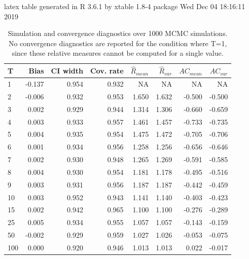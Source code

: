 \documentclass[article]{jss}
\begin{document}

latex table generated in R 3.6.1 by xtable 1.8-4 package
Wed Dec 04 18:16:11 2019
\begin{table}[ht]
\centering
\caption{Simulation and convergence diagnostics over 1000 MCMC simulations. \footnotesize{No convergence diagnostics are reported for the condition where T=1, since these relative measures cannot be computed for a single value.}}
\label{tab:results}
\begin{tabular}{lrrrrrrr}
  \hline
T & Bias & CI width & Cov. rate & $\widehat{R}_{mean}$ & $\widehat{R}_{var}$ & $AC_{mean}$ & $AC_{var}$ \\
  \hline
   1 & -0.137 & 0.954 & 0.932 & NA & NA & NA & NA \\
     2 & -0.006 & 0.932 & 0.953 & 1.650 & 1.632 & -0.500 & -0.500 \\
     3 & 0.002 & 0.929 & 0.944 & 1.314 & 1.306 & -0.660 & -0.659 \\
     4 & 0.003 & 0.933 & 0.957 & 1.461 & 1.457 & -0.733 & -0.735 \\
     5 & 0.004 & 0.935 & 0.954 & 1.475 & 1.472 & -0.705 & -0.706 \\
     6 & 0.001 & 0.934 & 0.956 & 1.258 & 1.256 & -0.656 & -0.646 \\
     7 & 0.002 & 0.930 & 0.948 & 1.265 & 1.269 & -0.591 & -0.585 \\
     8 & 0.004 & 0.930 & 0.954 & 1.181 & 1.178 & -0.495 & -0.516 \\
     9 & 0.003 & 0.931 & 0.956 & 1.187 & 1.187 & -0.442 & -0.459 \\
    10 & 0.003 & 0.952 & 0.943 & 1.141 & 1.140 & -0.403 & -0.423 \\
    15 & 0.002 & 0.942 & 0.965 & 1.100 & 1.100 & -0.276 & -0.289 \\
    25 & 0.005 & 0.934 & 0.955 & 1.057 & 1.057 & -0.143 & -0.159 \\
    50 & -0.002 & 0.929 & 0.959 & 1.027 & 1.026 & -0.053 & -0.075 \\
   100 & 0.000 & 0.920 & 0.946 & 1.013 & 1.013 & 0.022 & -0.017 \\
   \hline
\end{tabular}
\end{table}
\end{document}
